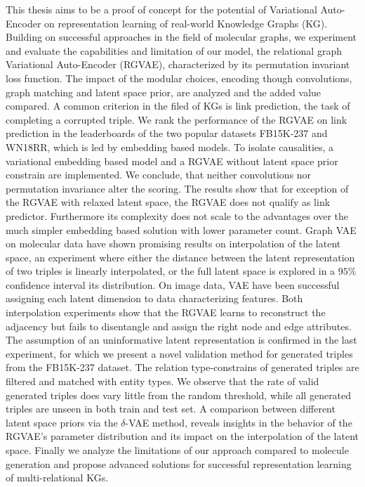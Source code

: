 \documentclass{article}
\makeatletter
\let\oldabstract\abstract
\let\oldendabstract\endabstract
\renewenvironment{abstract}
{\renewenvironment{quotation}%
               {\list{}{\addtolength{\leftmargin}{3em} %
                        \listparindent 1.5em%
                        \itemindent    \listparindent%
                        \rightmargin   \leftmargin%
                        \parsep        \z@ \@plus\p@}%
                \item\relax}%
               {\endlist}%
\oldabstract}
{\oldendabstract}
\makeatother
\begin{document}
\newpage
{}

\begin{abstract}

This thesis aims to be a proof of concept for the potential of Variational Auto-Encoder on representation learning of real-world Knowledge Graphs (KG). Building on successful approaches in the field of molecular graphs, we experiment and evaluate the capabilities and limitation of our model, the relational graph Variational Auto-Encoder (RGVAE), characterized by its permutation invariant loss function. The impact of the modular choices, encoding though convolutions, graph matching and latent space prior, are analyzed and the added value compared. A common criterion in the filed of KGs is link prediction, the task of completing a corrupted triple. We rank the performance of the RGVAE on link prediction in the leaderboards of the two popular datasets FB15K-237 and WN18RR, which is led by embedding based models. To isolate causalities, a variational embedding based model and a RGVAE without latent space prior constrain are implemented. We conclude, that neither convolutions nor permutation invariance alter the scoring. The results show that for exception of the RGVAE with relaxed latent space, the RGVAE does not qualify as link predictor. Furthermore its complexity does not scale to the advantages over the much simpler embedding based solution with lower parameter count.
Graph VAE on molecular data have shown promising results on interpolation of the latent space, an experiment where either the distance between the latent representation of two triples is linearly interpolated, or the full latent space is explored in a $95$\% confidence interval its distribution. On image data, VAE have been successful assigning each latent dimension to data characterizing features. Both interpolation experiments show that the RGVAE learns to reconstruct the adjacency but fails to disentangle and assign the right node and edge attributes. The assumption of an uninformative latent representation is confirmed in the last experiment, for which we present a novel validation method for generated triples from the FB15K-237 dataset. The relation type-constrains of generated triples are filtered and matched with entity types. We observe that the rate of valid generated triples does vary little from the random threshold, while all generated triples are unseen in both train and test set. A comparison between different latent space priors via the $\delta$-VAE method, reveals insights in the behavior of the RGVAE's parameter distribution and its impact on the interpolation of the latent space. Finally we analyze the limitations of our approach compared to molecule generation and propose advanced solutions for successful representation learning of multi-relational KGs. 
\end{abstract}
\newpage
\end{document}
